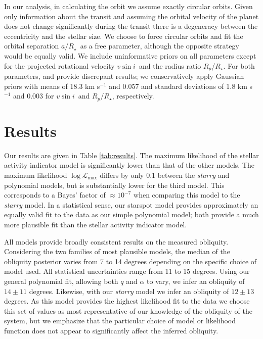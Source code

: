 \documentclass[twocolumn]{aastex63}
\newcommand{\vsini}{{$v \sin i$}}
\newcommand{\rstar}{{$R_\star$}}
\begin{document}
In our analysis, in calculating the orbit we assume exactly circular orbits. 
Given only information about the transit and assuming the orbital velocity of the planet does not change significantly during the transit there is a degeneracy between the eccentricity and the stellar size. 
We choose to force circular orbits and fit the orbital separation $a/$\rstar\ as a free parameter, although the opposite strategy would be equally valid.
We include uninformative priors on all parameters except for the projected rotational velocity \vsini\ and the radius ratio $R_p$/\rstar.
For both parameters, \citet{Benatti19} and \citet{Newton19} provide discrepant results; we conservatively apply Gaussian priors with means of 18.3 km s$^{-1}$ and 0.057 and standard deviations of 1.8 km s$^{-1}$ and 0.003 for \vsini\ and $R_p$/\rstar, respectively.



\section{Results}
\label{sec:results}

Our results are given in Table \ref{tab:results}. 
The maximum likelihood of the stellar activity indicator model is significantly lower than that of the other models. 
The maximum likelihood $\log \mathcal{L}_\textrm{max}$ differs by only 0.1 between the \textit{starry} and polynomial models, but is substantially lower for the third model. 
This corresponds to a Bayes' factor of $\approx 10^{-7}$ when comparing this model to the \textit{starry} model.
In a statistical sense, our starspot model provides approximately an equally valid fit to the data as our simple polynomial model; both provide a much more plausible fit than the stellar activity indicator model.

All models provide broadly consistent results on the measured obliquity. Considering the two families of most plausible models, the median of the obliquity posterior varies from 7 to 14 degrees depending on the specific choice of model used.
All statistical uncertainties range from 11 to 15 degrees.
Using our general polynomial fit, allowing both $q$ and $\alpha$ to vary, we infer an obliquity of $14 \pm 11$ degrees.
Likewise, with our \textit{starry} model we infer an obliquity of $12 \pm 13$ degrees.
As this model provides the highest likelihood fit to the data we choose this set of values as most representative of our knowledge of the obliquity of the system, but we emphasize that the particular choice of model or likelihood function does not appear to significantly affect the inferred obliquity. 
\end{document}
